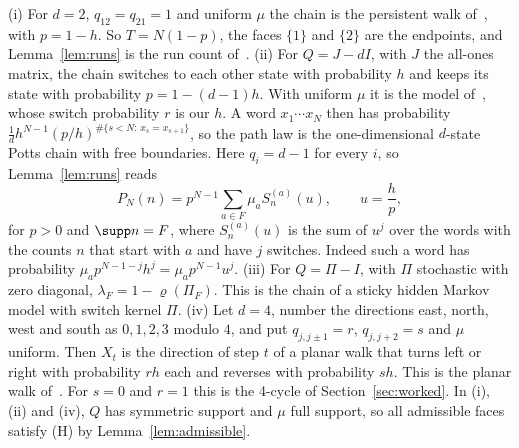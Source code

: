 \begin{example}\label{ex:models}
(i) For $d=2$, $q_{12}=q_{21}=1$ and uniform $\mu$ the chain is the persistent
walk of~\cite{paperA}, with $p=1-h$. So $T=N(1-p)$, the faces
$\{1\}$ and $\{2\}$ are the endpoints, and Lemma~\ref{lem:runs} is the run count
of~\cite{paperA}. (ii) For $Q=J-dI$, with $J$ the all-ones matrix, the chain
switches to each other state with probability $h$ and keeps its state with
probability $p=1-(d-1)h$. With uniform $\mu$ it is the model of~\cite{paperB},
whose switch probability $r$ is our $h$. A word $x_1\cdots x_N$ then has
probability $\frac1dh^{N-1}(p/h)^{\#\{s<N:\,x_s=x_{s+1}\}}$, so the path law is the
one-dimensional $d$-state Potts chain with free boundaries. Here $q_i=d-1$ for
every $i$, so Lemma~\ref{lem:runs} reads
\begin{equation}\label{eq:runform}
 P_N(n)=p^{N-1}\sum_{a\in F}\mu_aS^{(a)}_n(u),\qquad u=\frac hp,
\end{equation}
for $p>0$ and $\supp n=F$, where $S^{(a)}_n(u)$ is the sum of $u^j$ over the words with
the counts $n$ that start with $a$ and have $j$ switches. Indeed such a word has
probability $\mu_ap^{N-1-j}h^j=\mu_ap^{N-1}u^j$. (iii) For $Q=\Pi-I$, with $\Pi$
stochastic with zero diagonal, $\lambda_F=1-\varrho(\Pi_F)$. This is the chain of a
sticky hidden Markov model with switch kernel $\Pi$. (iv) Let $d=4$, number the directions east, north,
west and south as $0,1,2,3$ modulo $4$, and put $q_{j,j\pm1}=r$, $q_{j,j+2}=s$
and $\mu$ uniform. Then $X_t$ is the direction of step $t$ of a planar walk that
turns left or right with probability $rh$ each and reverses with probability
$sh$. This is the planar walk of~\cite{paperE}. For $s=0$ and $r=1$ this is the 4-cycle of
Section~\ref{sec:worked}. In (i), (ii) and (iv), $Q$ has symmetric support and
$\mu$ full support, so all admissible faces satisfy \textup{(H)} by
Lemma~\ref{lem:admissible}.
\end{example}
